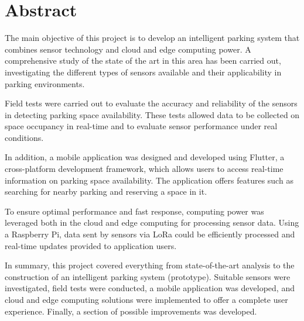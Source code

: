 \newpage
\section*{Abstract}
The main objective of this project is to develop an intelligent parking system that combines sensor technology and cloud and edge computing power. A comprehensive study of the state of the art in this area has been carried out, investigating the different types of sensors available and their applicability in parking environments.

Field tests were carried out to evaluate the accuracy and reliability of the sensors in detecting parking space availability. These tests allowed data to be collected on space occupancy in real-time and to evaluate sensor performance under real conditions.

In addition, a mobile application was designed and developed using Flutter, a cross-platform development framework, which allows users to access real-time information on parking space availability. The application offers features such as searching for nearby parking and reserving a space in it.

To ensure optimal performance and fast response, computing power was leveraged both in the cloud and edge computing for processing sensor data. Using a Raspberry Pi, data sent by sensors via LoRa could be efficiently processed and real-time updates provided to application users.

In summary, this project covered everything from state-of-the-art analysis to the construction of an intelligent parking system (prototype). Suitable sensors were investigated, field tests were conducted, a mobile application was developed, and cloud and edge computing solutions were implemented to offer a complete user experience. Finally, a section of possible improvements was developed.
